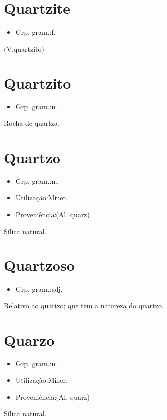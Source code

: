 \section{Quartzite}
\begin{itemize}
\item {Grp. gram.:f.}
\end{itemize}
(V.quartzito)
\section{Quartzito}
\begin{itemize}
\item {Grp. gram.:m.}
\end{itemize}
Rocha de quartzo.
\section{Quartzo}
\begin{itemize}
\item {Grp. gram.:m.}
\end{itemize}
\begin{itemize}
\item {Utilização:Miner.}
\end{itemize}
\begin{itemize}
\item {Proveniência:(Al. \textunderscore quarz\textunderscore )}
\end{itemize}
Sílica natural.
\section{Quartzoso}
\begin{itemize}
\item {Grp. gram.:adj.}
\end{itemize}
Relativo ao quartzo; que tem a natureza do quartzo.
\section{Quarzo}
\begin{itemize}
\item {Grp. gram.:m.}
\end{itemize}
\begin{itemize}
\item {Utilização:Miner.}
\end{itemize}
\begin{itemize}
\item {Proveniência:(Al. \textunderscore quarz\textunderscore )}
\end{itemize}
Sílica natural.
